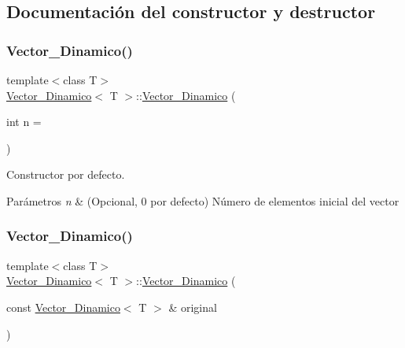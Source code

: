 \subsection{Documentación del constructor y destructor}
\mbox{\label{classVector__Dinamico_ae0a5b3fc342ecf8524cca578e0220c91}} 
\subsubsection{\texorpdfstring{Vector\_Dinamico()}{Vector\_Dinamico()}\hspace{0.1cm}{\footnotesize\ttfamily [1/2]}}
{\footnotesize\ttfamily template$<$class T$>$ \\
\mbox{\hyperlink{classVector__Dinamico}{Vector\+\_\+\+Dinamico}}$<$ T $>$\+::\mbox{\hyperlink{classVector__Dinamico}{Vector\+\_\+\+Dinamico}} (\begin{DoxyParamCaption}\item[{int}]{n = {} }\end{DoxyParamCaption})}



Constructor por defecto. 


\begin{DoxyParams}{Parámetros}
{\em n} & (Opcional, 0 por defecto) Número de elementos inicial del vector \\
\hline
\end{DoxyParams}
\mbox{\label{classVector__Dinamico_af555ebdf8afb084abee718a6514be8a7}} 
\subsubsection{\texorpdfstring{Vector\_Dinamico()}{Vector\_Dinamico()}\hspace{0.1cm}{\footnotesize\ttfamily [2/2]}}
{\footnotesize\ttfamily template$<$class T$>$ \\
\mbox{\hyperlink{classVector__Dinamico}{Vector\+\_\+\+Dinamico}}$<$ T $>$\+::\mbox{\hyperlink{classVector__Dinamico}{Vector\+\_\+\+Dinamico}} (\begin{DoxyParamCaption}\item[{const \mbox{\hyperlink{classVector__Dinamico}{Vector\+\_\+\+Dinamico}}$<$ T $>$ \&}]{original }\end{DoxyParamCaption})}



